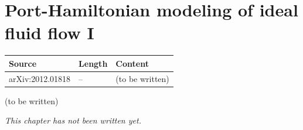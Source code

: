 \chapter{Port-Hamiltonian modeling of ideal fluid flow I}\label{ch:c24}
\begin{paracol}{2}

\begin{sources}
\begin{tabularx}{\linewidth}{@{}l l L@{}}
\toprule
\textbf{Source} & \textbf{Length} & \textbf{Content}\\
\midrule
arXiv:2012.01818 & -- & (to be written)\\
\bottomrule
\end{tabularx}

\end{sources}

\begin{reading}
(to be written)
\end{reading}

\emph{This chapter has not been written yet.}

\flushside
\end{paracol}
